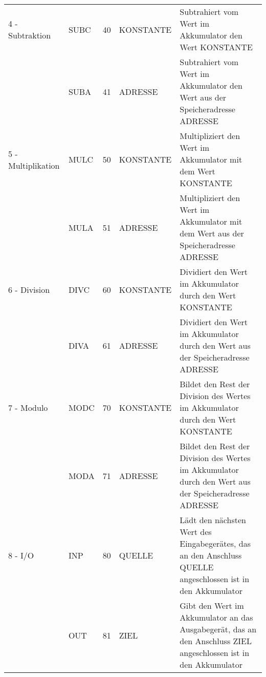 \documentclass[a4paper,10pt]{article}
\begin{document}
\begin{table}[h]
\begin{tabular}{l|l|c|l|p{6.85cm}}
\hline
4 - Subtraktion & SUBC & 40 & KONSTANTE & Subtrahiert vom Wert im Akkumulator den Wert KONSTANTE\\
& SUBA & 41 & ADRESSE & Subtrahiert vom Wert im Akkumulator den Wert aus der Speicheradresse ADRESSE\\
\hline
5 - Multiplikation & MULC & 50 & KONSTANTE & Multipliziert den Wert im Akkumulator mit dem Wert KONSTANTE\\
& MULA & 51 & ADRESSE & Multipliziert den Wert im Akkumulator mit dem Wert aus der Speicheradresse ADRESSE\\
\hline
6 - Division & DIVC & 60 & KONSTANTE & Dividiert den Wert im Akkumulator durch den Wert KONSTANTE\\
& DIVA & 61 & ADRESSE & Dividiert den Wert im Akkumulator durch den Wert aus der Speicheradresse ADRESSE\\
\hline
7 - Modulo & MODC & 70 & KONSTANTE & Bildet den Rest der Division des Wertes im Akkumulator durch den Wert KONSTANTE\\
& MODA & 71 & ADRESSE & Bildet den Rest der Division des Wertes im Akkumulator durch den Wert aus der Speicheradresse ADRESSE\\
\hline
8 - I/O & INP & 80 & QUELLE & Lädt den nächsten Wert des Eingabegerätes, das an den Anschluss QUELLE angeschlossen ist in den Akkumulator\\
& OUT & 81 & ZIEL & Gibt den Wert im Akkumulator an das Ausgabegerät, das an den Anschluss ZIEL angeschlossen ist in den Akkumulator\\

\end{tabular}
\end{table}
\end{document}
